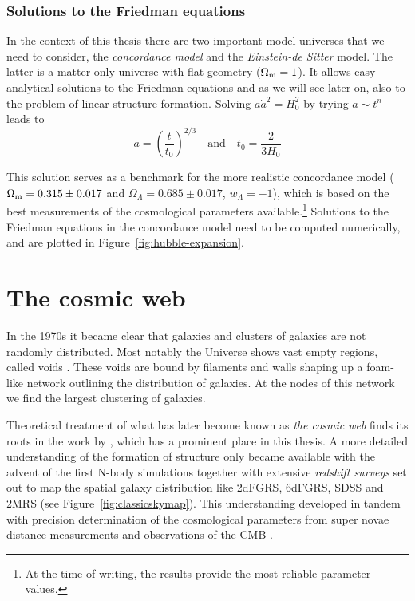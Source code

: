 \subsubsection{Solutions to the Friedman equations}
In the context of this thesis there are two important model universes that we need to consider, the \emph{concordance model} and the \emph{Einstein-de Sitter} model. The latter is a matter-only universe with flat geometry ($\Omega_{\rm m} = 1$). It allows easy analytical solutions to the Friedman equations and as we will see later on, also to the problem of linear structure formation. Solving $a\dot{a}^2 = H_0^2$ by trying $a \sim t^n$ leads to
\[a = {\left(\frac{t}{t_0}\right)}^{2/3}\quad\textrm{and}\quad t_0 = \frac{2}{3 H_0}\]

This solution serves as a benchmark for the more realistic concordance model ($\Omega_{\rm m} = 0.315 \pm 0.017$ and $\Omega_{\Lambda} = 0.685 \pm 0.017$, $w_{\Lambda} = -1$), which is based on the best measurements of the cosmological parameters available.\footnote{At the time of writing, the \citet{Planck2013-pp} results provide the most reliable parameter values.} Solutions to the Friedman equations in the concordance model need to be computed numerically, and are plotted in Figure~\ref{fig:hubble-expansion}.


\section{The cosmic web}\label{section:cosmicweb}
In the 1970s it became clear that galaxies and clusters of galaxies are not randomly distributed. Most notably the Universe shows vast empty regions, called voids \citep{Chincarini1975, Gregory1978, Zeldovich1982, Lapparent1986}. These voids are bound by filaments and walls shaping up a foam-like network outlining the distribution of galaxies. At the nodes of this network we find the largest clustering of galaxies.

Theoretical treatment of what has later become known as \emph{the cosmic web} \citep{Bond1996} finds its roots in the work by \citet{Zeldovich1970}, which has a prominent place in this thesis.
A more detailed understanding of the formation of structure only became available with the advent of the first N-body simulations \citep{Doroshkevich1980, Springel2005} together with extensive \emph{redshift surveys} set out to map the spatial galaxy distribution like \ac{2dFGRS}, \ac{6dFGRS}, \ac{SDSS} and \ac{2MRS} (see Figure~\ref{fig:classicskymap}).
This understanding developed in tandem with precision determination of the cosmological parameters from super novae distance measurements \citep{Riess1998, Perlmutter1999} and observations of the \ac{CMB} \citep{COBE-FIRAS-1994, Ruhl2003, Komatsu2003, Planck2013-pp}.

